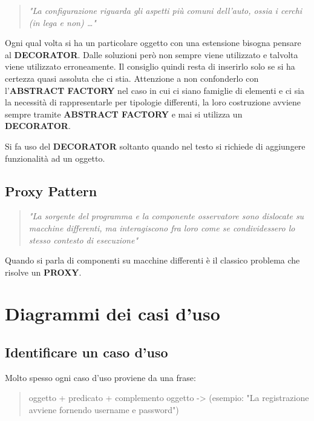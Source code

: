 \documentclass[a4paper,11pt]{article}
\begin{document}
	\begin{quote}
		\textit{"La configurazione riguarda gli aspetti più comuni dell'auto, ossia i cerchi (in lega e non) \dots"}
	\end{quote}
	
	Ogni qual volta si ha un particolare oggetto con una estensione bisogna pensare al \textbf{DECORATOR}.  Dalle soluzioni però non sempre viene utilizzato e talvolta viene utilizzato erroneamente. Il consiglio quindi resta di inserirlo solo se si ha certezza quasi assoluta che ci stia. Attenzione a non confonderlo con l'\textbf{ABSTRACT FACTORY} nel caso in cui ci siano famiglie di elementi e ci sia la necessità di rappresentarle per tipologie differenti, la loro costruzione avviene sempre tramite \textbf{ABSTRACT FACTORY} e mai si utilizza un \textbf{DECORATOR}.

	Si fa uso del \textbf{DECORATOR} soltanto quando nel testo si richiede di aggiungere funzionalità ad un oggetto.
	
	
	\subsection{Proxy Pattern}
	
	\begin{quote}
		\textit{"La sorgente del programma e la componente osservatore sono dislocate su macchine differenti, ma interagiscono fra loro come se condividessero lo stesso contesto di esecuzione"}
	\end{quote}
	Quando si parla di componenti su macchine differenti è il classico problema che risolve un \textbf{PROXY}.
	
	
	
	

\newpage	
	\section{Diagrammi dei casi d'uso}
		
		\subsection{Identificare un caso d'uso}
		Molto spesso ogni caso d'uso proviene da una frase:
			
			\begin{quote}
				oggetto + predicato + complemento oggetto -> (esempio: "La registrazione avviene fornendo username e password")
			\end{quote}
			
\end{document}
